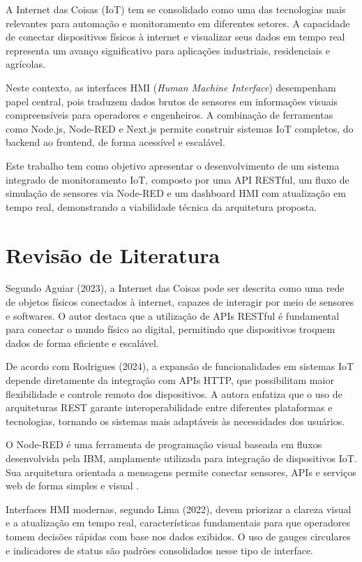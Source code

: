 \documentclass[12pt]{unisenaiclass}
\begin{document}
A Internet das Coisas (IoT) tem se consolidado como uma das tecnologias mais relevantes para automação e monitoramento em diferentes setores. A capacidade de conectar dispositivos físicos à internet e visualizar seus dados em tempo real representa um avanço significativo para aplicações industriais, residenciais e agrícolas.

Neste contexto, as interfaces HMI (\textit{Human Machine Interface}) desempenham papel central, pois traduzem dados brutos de sensores em informações visuais compreensíveis para operadores e engenheiros. A combinação de ferramentas como Node.js, Node-RED e Next.js permite construir sistemas IoT completos, do backend ao frontend, de forma acessível e escalável.

Este trabalho tem como objetivo apresentar o desenvolvimento de um sistema integrado de monitoramento IoT, composto por uma API RESTful, um fluxo de simulação de sensores via Node-RED e um dashboard HMI com atualização em tempo real, demonstrando a viabilidade técnica da arquitetura proposta.

\section{Revisão de Literatura}

Segundo Aguiar (2023), a Internet das Coisas pode ser descrita como uma rede de objetos físicos conectados à internet, capazes de interagir por meio de sensores e softwares. O autor destaca que a utilização de APIs RESTful é fundamental para conectar o mundo físico ao digital, permitindo que dispositivos troquem dados de forma eficiente e escalável.

De acordo com Rodrigues (2024), a expansão de funcionalidades em sistemas IoT depende diretamente da integração com APIs HTTP, que possibilitam maior flexibilidade e controle remoto dos dispositivos. A autora enfatiza que o uso de arquiteturas REST garante interoperabilidade entre diferentes plataformas e tecnologias, tornando os sistemas mais adaptáveis às necessidades dos usuários.

O Node-RED é uma ferramenta de programação visual baseada em fluxos desenvolvida pela IBM, amplamente utilizada para integração de dispositivos IoT. Sua arquitetura orientada a mensagens permite conectar sensores, APIs e serviços web de forma simples e visual \cite{ibm2023nodered}.

Interfaces HMI modernas, segundo Lima (2022), devem priorizar a clareza visual e a atualização em tempo real, características fundamentais para que operadores tomem decisões rápidas com base nos dados exibidos. O uso de gauges circulares e indicadores de status são padrões consolidados nesse tipo de interface.
\end{document}
